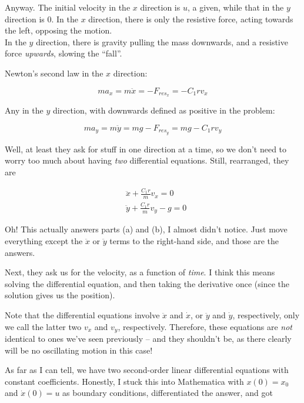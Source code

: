 \documentclass[12pt,a4paper]{report}
\begin{document}
Anyway. The initial velocity in the $x$ direction is $u$, a given, while that in the $y$ direction is 0. In the $x$ direction, there is only the resistive force, acting towards the left, opposing the motion.\\
In the $y$ direction, there is gravity pulling the mass downwards, and a resistive force \emph{upwards}, slowing the ``fall''.

Newton's second law in the $x$ direction:

\begin{equation}
m a_x = m \ddot{x} = - F_{res_x} = - C_1 r v_x
\end{equation}

Any in the $y$ direction, with downwards defined as positive in the problem:

\begin{equation}
m a_y = m \ddot{y} = m g - F_{res_y} = m g - C_1 r v_y
\end{equation}

Well, at least they ask for stuff in one direction at a time, so we don't need to worry too much about having \emph{two} differential equations. Still, rearranged, they are

\begin{align}
&\ddot{x} + \frac{C_1 r}{m} v_x = 0\\
&\ddot{y} + \frac{C_1 r}{m} v_y - g = 0
\end{align}

Oh! This actually answers parts (a) and (b), I almost didn't notice. Just move everything except the $\ddot{x}$ or $\ddot{y}$ terms to the right-hand side, and those are the answers.

Next, they ask us for the velocity, as a function of \emph{time}. I think this means solving the differential equation, and then taking the derivative once (since the solution gives us the position).

Note that the differential equations involve $\ddot{x}$ and $\dot{x}$, or $\ddot{y}$ and $\dot{y}$, respectively, only we call the latter two $v_x$ and $v_y$, respectively. Therefore, these equations are \emph{not} identical to ones we've seen previously -- and they shouldn't be, as there clearly will be no oscillating motion in this case!

As far as I can tell, we have two second-order linear differential equations with constant coefficients. Honestly, I stuck this into Mathematica with $x(0) = x_0$ and $\dot{x}(0) = u$ as boundary conditions, differentiated the answer, and got
\end{document}
